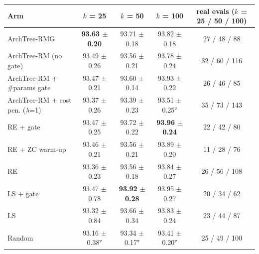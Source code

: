 \begin{tabular}{@{}lcccc@{}}
\toprule
Arm & $k$ = 25 & $k$ = 50 & $k$ = 100 & real evals ($k$ = 25 / 50 / 100)\\
\midrule
ArchTree-RMG & \textbf{93.63 $\pm$ 0.20} & 93.71 $\pm$ 0.18 & 93.82 $\pm$ 0.18 & 27 / 48 / 88\\
ArchTree-RM (no gate) & 93.49 $\pm$ 0.26 & 93.56 $\pm$ 0.21 & 93.78 $\pm$ 0.24 & 32 / 60 / 116\\
ArchTree-RM + \#params gate & 93.47 $\pm$ 0.21 & 93.60 $\pm$ 0.14 & 93.93 $\pm$ 0.22 & 26 / 46 / 85\\
ArchTree-RM + cost pen. ($\lambda$=1) & 93.37 $\pm$ 0.26 & 93.39 $\pm$ 0.23 & 93.51 $\pm$ 0.25$^{\triangledown}$ & 35 / 73 / 143\\
RE + gate & 93.47 $\pm$ 0.25 & 93.72 $\pm$ 0.22 & \textbf{93.96 $\pm$ 0.24} & 22 / 42 / 80\\
RE + ZC warm-up & 93.46 $\pm$ 0.21 & 93.56 $\pm$ 0.21 & 93.89 $\pm$ 0.20 & 11 / 28 / 76\\
RE & 93.36 $\pm$ 0.23 & 93.56 $\pm$ 0.18 & 93.84 $\pm$ 0.27 & 26 / 56 / 108\\
LS + gate & 93.47 $\pm$ 0.78 & \textbf{93.92 $\pm$ 0.28} & 93.95 $\pm$ 0.27 & 20 / 34 / 62\\
LS & 93.32 $\pm$ 0.84 & 93.66 $\pm$ 0.34 & 93.83 $\pm$ 0.24 & 23 / 44 / 87\\
Random & 93.16 $\pm$ 0.38$^{\triangledown}$ & 93.34 $\pm$ 0.17$^{\triangledown}$ & 93.41 $\pm$ 0.20$^{\triangledown}$ & 25 / 49 / 100\\
\bottomrule
\end{tabular}
